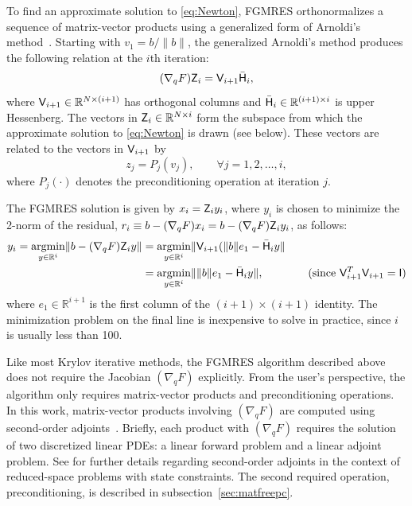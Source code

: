 To find an approximate solution to \eqref{eq:Newton}, FGMRES orthonormalizes a
sequence of matrix-vector products using a generalized form of Arnoldi's
method~\cite{saad:2003}.  Starting with $v_{1} = b/\|b\|$, the generalized
Arnoldi's method produces the following relation at the $i$th iteration:
\begin{equation}\label{eq:arnoldi}
  (\nabla_q F) \mathsf{Z}_{i} = \mathsf{V}_{i+1} \bar{\mathsf{H}}_{i},
\end{equation}
where $\mathsf{V}_{i+1} \in \mathbb{R}^{N\times (i+1)}$ has orthogonal columns and
$\bar{\mathsf{H}}_{i} \in \mathbb{R}^{(i+1)\times i}$ is upper Hessenberg.  The
vectors in $\mathsf{Z}_{i} \in \mathbb{R}^{N\times i}$ form the subspace from which
the approximate solution to \eqref{eq:Newton} is drawn (see below).  These
vectors are related to the vectors in $\mathsf{V}_{i+1}$ by
\begin{equation*}
  z_{j} = P_j(v_{j}), \qquad \forall j = 1,2,\ldots,i,
\end{equation*}
where $P_j(\cdot)$ denotes the preconditioning operation at iteration $j$.    

The FGMRES solution is given by $x_{i} = \mathsf{Z}_{i} y_{i}$, where $y_{i}$ is
chosen to minimize the 2-norm of the residual, $r_i \equiv b -  (\nabla_q F) x_i = b -  (\nabla_q F)\mathsf{Z}_i y_i$, as
follows:
\begin{align*}
  y_{i} = \underset{y \in \mathbb{R}^i}{\textrm{argmin}}
  \lVert b -  (\nabla_q F) \mathsf{Z}_i y \| 
  &= \underset{y \in \mathbb{R}^i}{\textrm{argmin}}
  \lVert \mathsf{V}_{i+1} (\|b\| e_1 - \bar{\mathsf{H}}_{i} y \| \\
  &= \underset{y \in \mathbb{R}^i}{\textrm{argmin}}
  \lVert \|b\| e_1 - \bar{\mathsf{H}}_{i} y \|,
  \qquad\qquad\text{(since $\mathsf{V}_{i+1}^T \mathsf{V}_{i+1} = \mathsf{I}$)}
\end{align*}
where $e_{1} \in \mathbb{R}^{i+1}$ is the first column of the $(i+1)\times(i+1)$
identity. The minimization problem on the final line is inexpensive to solve in
practice, since $i$ is usually less than 100.

Like most Krylov iterative methods, the FGMRES algorithm described above does
not require the Jacobian $(\nabla_q F)$ explicitly.  From the user's
perspective, the algorithm only requires matrix-vector products and
preconditioning operations.  In this work, matrix-vector products involving
$(\nabla_q F)$ are computed using second-order adjoints~\cite{wang:1992,
  hicken:inexact2014}.  Briefly, each product with $(\nabla_q F)$ requires the
solution of two discretized linear PDEs: a linear forward problem and a linear
adjoint problem.  See \cite{dener:scitech2015} for further details regarding
second-order adjoints in the context of reduced-space problems with state
constraints.  The second required operation, preconditioning, is described in
subsection~\ref{sec:matfreepc}.


